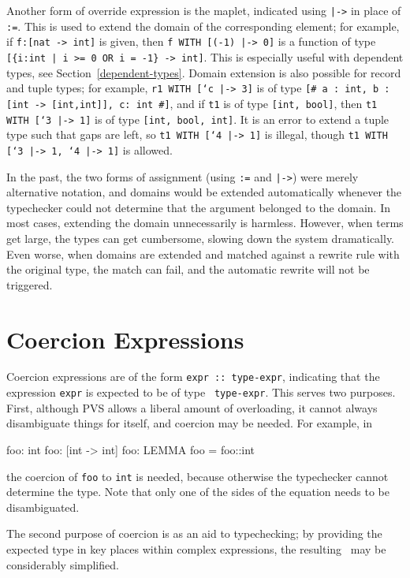 Another form of override expression is the maplet, indicated using
\texttt{|->} in place of \texttt{:=}.  This is used to extend the domain
of the corresponding element; for example, if \texttt{f:[nat -> int]} is
given, then \texttt{f WITH [(-1) |-> 0]} is a function of type
\texttt{[\{i:int | i >= 0 OR i = -1\} -> int]}.  This is especially useful
with dependent types, see Section~\ref{dependent-types}.  Domain extension
is also possible for record and tuple types; for example, \texttt{r1 WITH
[`c |-> 3]} is of type \texttt{[\# a : int, b : [int -> [int,int]], c: int
\#]}, and if \texttt{t1} is of type \texttt{[int, bool]}, then \texttt{t1
WITH [`3 |-> 1]} is of type \texttt{[int, bool, int]}.  It is an error to
extend a tuple type such that gaps are left, so \texttt{t1 WITH [`4 |->
1]} is illegal, though \texttt{t1 WITH [`3 |-> 1, `4 |-> 1]} is allowed.

In the past, the two forms of assignment (using \texttt{:=} and
\texttt{|->}) were merely alternative notation, and domains would be
extended automatically whenever the typechecker could not determine that
the argument belonged to the domain.  In most cases, extending the domain
unnecessarily is harmless.  However, when terms get large, the types can
get cumbersome, slowing down the system dramatically.  Even worse, when
domains are extended and matched against a rewrite rule with the original
type, the match can fail, and the automatic rewrite will not be triggered.

\section{Coercion Expressions}\label{coercions}

Coercion expressions are of the form \texttt{expr ::\ type-expr}, indicating
that the expression \texttt{expr} is expected to be of type \texttt{
type-expr}.  This serves two purposes.  First, although PVS allows a
liberal amount of overloading, it cannot always disambiguate things for
itself, and coercion may be needed.  For example, in
\begin{pvsex}
  foo: int
  foo: [int -> int]
  foo: LEMMA foo = foo::int
\end{pvsex}
%
the coercion of \texttt{foo} to \texttt{int} is needed, because otherwise the
typechecker cannot determine the type.  Note that only one of the sides
of the equation needs to be disambiguated.

The second purpose of coercion is as an aid to typechecking; by
providing the expected type in key places within complex expressions,
the resulting \tccs\ may be considerably simplified.



